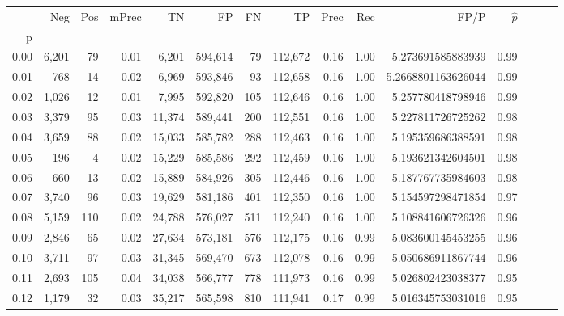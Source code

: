 \begin{tabular}{rrrrrrrrrrrrrrr}
\toprule
{} &     Neg &    Pos & mPrec &       TN &       FP &       FN &       TP &  Prec &   Rec &                  FP/P & $\hat{p}$ \\
p    &         &        &       &          &          &          &          &       &       &                       &           \\
\midrule
0.00 &   6,201 &     79 &  0.01 &    6,201 &  594,614 &       79 &  112,672 &  0.16 &  1.00 &     5.273691585883939 &      0.99 \\
0.01 &     768 &     14 &  0.02 &    6,969 &  593,846 &       93 &  112,658 &  0.16 &  1.00 &    5.2668801163626044 &      0.99 \\
0.02 &   1,026 &     12 &  0.01 &    7,995 &  592,820 &      105 &  112,646 &  0.16 &  1.00 &     5.257780418798946 &      0.99 \\
0.03 &   3,379 &     95 &  0.03 &   11,374 &  589,441 &      200 &  112,551 &  0.16 &  1.00 &     5.227811726725262 &      0.98 \\
0.04 &   3,659 &     88 &  0.02 &   15,033 &  585,782 &      288 &  112,463 &  0.16 &  1.00 &     5.195359686388591 &      0.98 \\
0.05 &     196 &      4 &  0.02 &   15,229 &  585,586 &      292 &  112,459 &  0.16 &  1.00 &     5.193621342604501 &      0.98 \\
0.06 &     660 &     13 &  0.02 &   15,889 &  584,926 &      305 &  112,446 &  0.16 &  1.00 &     5.187767735984603 &      0.98 \\
0.07 &   3,740 &     96 &  0.03 &   19,629 &  581,186 &      401 &  112,350 &  0.16 &  1.00 &     5.154597298471854 &      0.97 \\
0.08 &   5,159 &    110 &  0.02 &   24,788 &  576,027 &      511 &  112,240 &  0.16 &  1.00 &     5.108841606726326 &      0.96 \\
0.09 &   2,846 &     65 &  0.02 &   27,634 &  573,181 &      576 &  112,175 &  0.16 &  0.99 &     5.083600145453255 &      0.96 \\
0.10 &   3,711 &     97 &  0.03 &   31,345 &  569,470 &      673 &  112,078 &  0.16 &  0.99 &     5.050686911867744 &      0.96 \\
0.11 &   2,693 &    105 &  0.04 &   34,038 &  566,777 &      778 &  111,973 &  0.16 &  0.99 &     5.026802423038377 &      0.95 \\
0.12 &   1,179 &     32 &  0.03 &   35,217 &  565,598 &      810 &  111,941 &  0.17 &  0.99 &     5.016345753031016 &      0.95 \\

\end{tabular}
